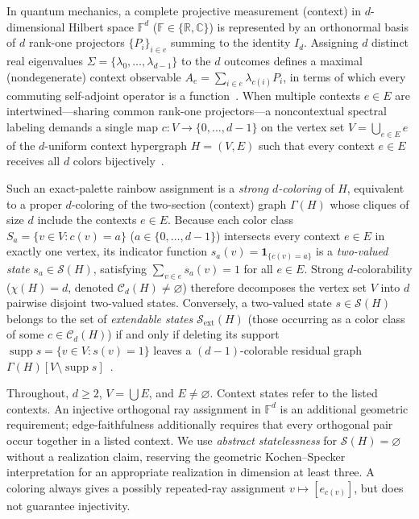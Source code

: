 \documentclass[aps,pra,reprint,superscriptaddress,longbibliography,nofootinbib,floatfix,10pt]{revtex4-2}
\theoremstyle{definition}\newtheorem{definition}[theorem]{Definition}
\theoremstyle{remark}\newtheorem{remark}[theorem]{Remark}
\newcommand{\C}{\mathbb C}\newcommand{\R}{\mathbb R}\newcommand{\Q}{\mathbb Q}
\newcommand{\F}{\mathbb F}\newcommand{\Z}{\mathbb Z}\newcommand{\PP}{\mathbb P}
\newcommand{\Sc}{\mathcal S}\newcommand{\Cc}{\mathcal C}
\DeclareMathOperator{\supp}{supp}\DeclareMathOperator{\conv}{conv}
\begin{document}
In quantum mechanics, a complete projective measurement (context) in $d$-dimensional Hilbert space $\F^d$ ($\F\in\{\R,\C\}$) is represented by an orthonormal basis of $d$ rank-one projectors $\{P_i\}_{i\in e}$ summing to the identity $I_d$. Assigning $d$ distinct real eigenvalues $\Sigma=\{\lambda_0,\ldots,\lambda_{d-1}\}$ to the $d$ outcomes defines a maximal (nondegenerate) context observable $A_e=\sum_{i\in e}\lambda_{c(i)}P_i$, in terms of which every commuting self-adjoint operator is a function~\cite{v-neumann-31,halmos-vs}. When multiple contexts $e\in E$ are intertwined—sharing common rank-one projectors—a noncontextual spectral labeling demands a single map $c:V\to\{0,\ldots,d-1\}$ on the vertex set $V=\bigcup_{e\in E}e$ of the $d$-uniform context hypergraph $H=(V,E)$ such that every context $e\in E$ receives all $d$ colors bijectively~\cite{svozil-2020-c,svozil-2021-chroma,svozil2026contexts}.

Such an exact-palette rainbow assignment is a \emph{strong $d$-coloring} of $H$, equivalent to a proper $d$-coloring of the two-section (context) graph $\Gamma(H)$ whose cliques of size $d$ include the contexts $e\in E$. Because each color class $S_a=\{v\in V:c(v)=a\}$ ($a\in\{0,\ldots,d-1\}$) intersects every context $e\in E$ in exactly one vertex, its indicator function $s_a(v)=\mathbf{1}_{\{c(v)=a\}}$ is a \emph{two-valued state} $s_a\in\Sc(H)$, satisfying $\sum_{v\in e}s_a(v)=1$ for all $e\in E$. Strong $d$-colorability ($\chi(H)=d$, denoted $\Cc_d(H)\neq\varnothing$) therefore decomposes the vertex set $V$ into $d$ pairwise disjoint two-valued states. Conversely, a two-valued state $s\in\Sc(H)$ belongs to the set of \emph{extendable states} $\Sc_{\mathrm{ext}}(H)$ (those occurring as a color class of some $c\in\Cc_d(H)$) if and only if deleting its support $\supp s=\{v\in V:s(v)=1\}$ leaves a $(d-1)$-colorable residual graph $\Gamma(H)[V\setminus\supp s]$~\cite{svozil2026contexts}.

Throughout, $d\ge2$, $V=\bigcup E$, and $E\ne\varnothing$. Context states refer to the listed contexts. An injective orthogonal ray assignment in $\F^d$ is an additional geometric requirement; edge-faithfulness additionally requires that every orthogonal pair occur together in a listed context. We use \emph{abstract statelessness} for $\Sc(H)=\varnothing$ without a realization claim, reserving the geometric Kochen--Specker interpretation for an appropriate realization in dimension at least three. A coloring always gives a possibly repeated-ray assignment $v\mapsto[e_{c(v)}]$, but does not guarantee injectivity.
\end{document}
